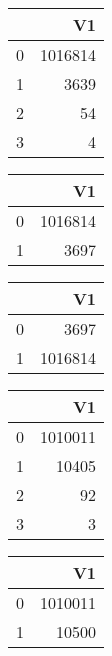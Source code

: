 \bigskip\bigskip
\centering
\begin{tabular}{rr}
  \hline
 & V1 \\ 
  \hline
0 & 1016814 \\ 
  1 & 3639 \\ 
  2 &  54 \\ 
  3 &   4 \\ 
   \hline
\end{tabular}

\bigskip\bigskip
\centering
\begin{tabular}{rr}
  \hline
 & V1 \\ 
  \hline
0 & 1016814 \\ 
  1 & 3697 \\ 
   \hline
\end{tabular}

\bigskip\bigskip
\centering
\begin{tabular}{rr}
  \hline
 & V1 \\ 
  \hline
0 & 3697 \\ 
  1 & 1016814 \\ 
   \hline
\end{tabular}

\bigskip\bigskip
\centering
\begin{tabular}{rr}
  \hline
 & V1 \\ 
  \hline
0 & 1010011 \\ 
  1 & 10405 \\ 
  2 &  92 \\ 
  3 &   3 \\ 
   \hline
\end{tabular}

\bigskip\bigskip
\centering
\begin{tabular}{rr}
  \hline
 & V1 \\ 
  \hline
0 & 1010011 \\ 
  1 & 10500 \\ 
   \hline
\end{tabular}

